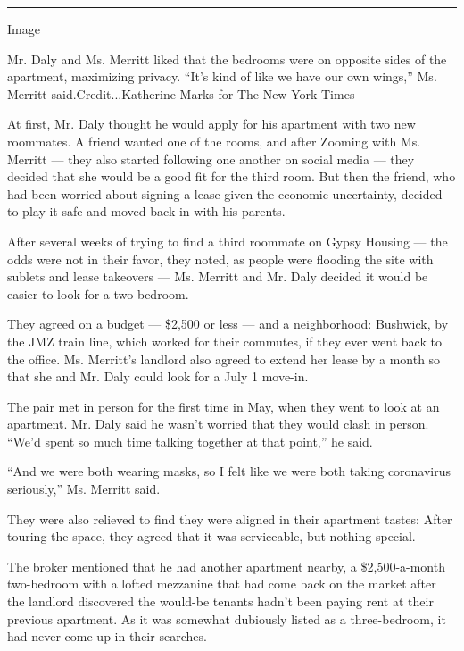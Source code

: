 \begin{center}\rule{0.5\linewidth}{\linethickness}\end{center}

Image

Mr. Daly and Ms. Merritt liked that the bedrooms were on opposite sides
of the apartment, maximizing privacy. ``It's kind of like we have our
own wings,'' Ms. Merritt said.Credit...Katherine Marks for The New York
Times

At first, Mr. Daly thought he would apply for his apartment with two new
roommates. A friend wanted one of the rooms, and after Zooming with Ms.
Merritt --- they also started following one another on social media ---
they decided that she would be a good fit for the third room. But then
the friend, who had been worried about signing a lease given the
economic uncertainty, decided to play it safe and moved back in with his
parents.

After several weeks of trying to find a third roommate on Gypsy Housing
--- the odds were not in their favor, they noted, as people were
flooding the site with sublets and lease takeovers --- Ms. Merritt and
Mr. Daly decided it would be easier to look for a two-bedroom.

They agreed on a budget --- \$2,500 or less --- and a neighborhood:
Bushwick, by the JMZ train line, which worked for their commutes, if
they ever went back to the office. Ms. Merritt's landlord also agreed to
extend her lease by a month so that she and Mr. Daly could look for a
July 1 move-in.

The pair met in person for the first time in May, when they went to look
at an apartment. Mr. Daly said he wasn't worried that they would clash
in person. ``We'd spent so much time talking together at that point,''
he said.

``And we were both wearing masks, so I felt like we were both taking
coronavirus seriously,'' Ms. Merritt said.

They were also relieved to find they were aligned in their apartment
tastes: After touring the space, they agreed that it was serviceable,
but nothing special.

The broker mentioned that he had another apartment nearby, a
\$2,500-a-month two-bedroom with a lofted mezzanine that had come back
on the market after the landlord discovered the would-be tenants hadn't
been paying rent at their previous apartment. As it was somewhat
dubiously listed as a three-bedroom, it had never come up in their
searches.

